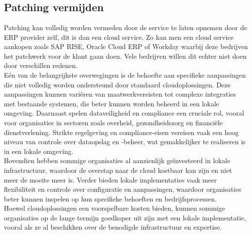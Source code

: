\documentclass[dutch,dit,thesis]{hogentreport}
\begin{document}
\chapter{}
\label{ch:corpus}

\section{Patching vermijden}

Patching kan volledig worden vermeden door de service te laten opnemen door de ERP provider zelf, dit is dan een cloud service. Zo kan men een cloud service aankopen zoals SAP RISE, Oracle Cloud ERP of Workday waarbij deze bedrijven het patchwerk voor de klant gaan doen. Vele bedrijven
 willen dit echter niet doen door verschillen redenen.\\
 
 Eén van de belangrijkste overwegingen is de behoefte aan specifieke aanpassingen die niet volledig worden ondersteund door standaard cloudoplossingen. 
 Deze aanpassingen kunnen variëren van maatwerkvereisten tot complexe integraties met bestaande systemen, die beter kunnen worden beheerd in een lokale omgeving.
Daarnaast spelen dataveiligheid en compliance een cruciale rol, vooral voor organisaties in sectoren zoals overheid, gezondheidszorg en financiële dienstverlening.
 Strikte regelgeving en compliance-eisen vereisen vaak een hoog niveau van controle over dataopslag en -beheer, wat gemakkelijker te realiseren is in een lokale omgeving.\\ 

Bovendien hebben sommige organisaties al aanzienlijk geïnvesteerd in lokale infrastructuur, waardoor de overstap naar de cloud kostbaar kan zijn en niet meer de moeite meer is.
Verder bieden lokale implementaties vaak meer flexibiliteit en controle over configuratie en aanpassingen, waardoor organisaties beter kunnen inspelen op hun specifieke behoeften en 
bedrijfsprocessen.\\

Hoewel cloudoplossingen een voorspelbare kosten bieden, kunnen sommige organisaties op de lange termijn goedkoper uit zijn met een lokale implementatie, vooral als
ze al beschikken over de benodigde infrastructuur en expertise.\\
\end{document}
